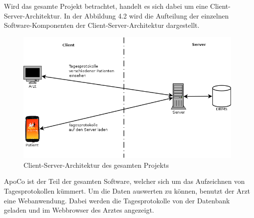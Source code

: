 Wird das gesamte Projekt betrachtet, handelt es sich dabei um eine Client-Server-Architektur.
In der Abbildung 4.2 wird die Aufteilung der einzelnen Software-Komponenten der Client-Server-Architektur dargestellt.\\

\begin{figure}[h]
  \centering
  \includegraphics[scale=0.5]{diagramme/kapitel4/client_server.png}
  \caption{Client-Server-Architektur des gesamten Projekts}
  
\end{figure}

ApoCo ist der Teil der gesamten Software, welcher sich um das Aufzeichnen von Tagesprotokollen k\"ummert.
Um die Daten auswerten zu k\"onnen, benutzt der Arzt eine Webanwendung.
Dabei werden die Tagesprotokolle von der Datenbank geladen und im Webbrowser des Arztes angezeigt.\\
 
